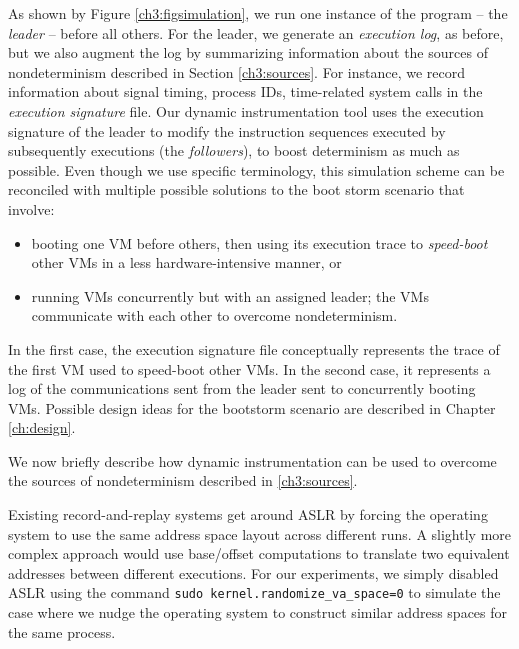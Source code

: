 As shown by Figure \ref{ch3:figsimulation}, we run one instance of the
program -- the {\em leader} -- before all others.
For the leader, we generate an {\em execution log}, as before,
but we also augment the log by summarizing information about the sources of nondeterminism
described in Section \ref{ch3:sources}. For instance, we record
information about signal timing, process IDs, time-related system calls
in the {\em execution signature} file. Our dynamic instrumentation tool
uses the execution signature of the leader
to modify the instruction sequences executed by subsequently
executions (the {\em followers}), to boost determinism as much as possible.
Even though we use specific terminology, this simulation scheme can be
reconciled with multiple possible solutions to the 
boot storm scenario that involve:
\begin{itemize}
\item
booting one VM before others,
then using its execution trace to {\em speed-boot} other VMs
in a less hardware-intensive manner, or
\item 
running VMs concurrently but with an assigned leader;
the VMs communicate with each other to overcome
nondeterminism.
\end{itemize}

In the first case, the execution signature file
conceptually represents the trace of the first VM used to speed-boot
other VMs. In the second case, it represents a log of the communications 
sent from the leader sent to concurrently booting VMs. Possible
design ideas for the bootstorm scenario are described 
in Chapter \ref{ch:design}.

We now briefly describe how dynamic instrumentation can be used to overcome
the sources of nondeterminism described in \ref{ch3:sources}. \newline

 \newline
Existing record-and-replay systems get around ASLR by
forcing the operating system to use the same address space layout across
different runs. A slightly more complex approach 
would use base/offset computations to translate two equivalent 
addresses between different executions. 
For our experiments, we simply disabled ASLR using the command
\texttt {sudo kernel.randomize\_va\_space=0} to simulate the 
case where we nudge the operating system to construct
similar address spaces for the same process. \newline

